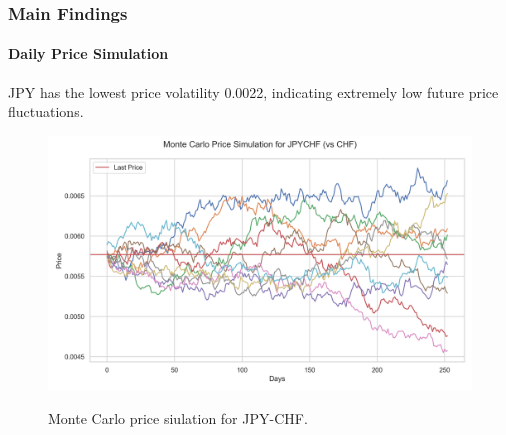 \documentclass[10pt]{beamer}
\begin{document}
\begin{frame}
\frametitle{Main Findings}
\framesubtitle{Daily Price Simulation}
JPY has the lowest price volatility 0.0022, indicating extremely low future price fluctuations. 

\begin{figure}
    \centering  \includegraphics[width=0.9\linewidth]{../../reports/figures/monte_carlo_price_simulation_JPYCHF_vs_CHF.png}  \label{fig:monte_carlo_price_simulation_JPYCHF_vs_CHF} 
    \caption{\footnotesize Monte Carlo price siulation for JPY-CHF.}
\end{figure}
\end{frame}
\end{document}
